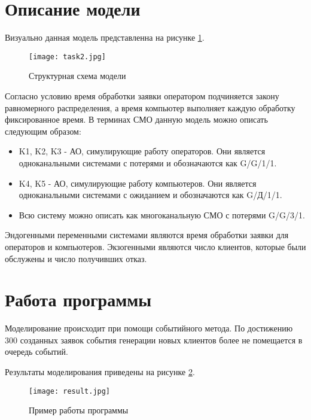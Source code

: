 \section{Описание модели}
	Визуально данная модель представленна на рисунке \ref{pic:scheme}.
	
	\begin{figure}[h]
		\begin{center}
			{\texttt{[image: task2.jpg]}
				\caption{Структурная схема модели}
				\label{pic:scheme}}
		\end{center}
	\end{figure}

	Согласно условию время обработки заявки оператором подчиняется закону равномерного распределения, а время компьютер выполняет каждую обработку фиксированное время. В терминах СМО данную модель можно описать следующим образом:
	\begin{itemize}
		\item K1, K2, K3 - АО, симулирующие работу операторов. Они является одноканальными системами с потерями и обозначаются как G/G/1/1.
		\item K4, K5 - АО, симулирующие работу компьютеров. Они является одноканальными системами с ожиданием и обозначаются как G/Д/1/1.
		\item Всю систему можно описать как многоканальную СМО с потерями G/G/3/1.
	\end{itemize}

	Эндогенными переменными системами являются время обработки заявки для операторов и компьютеров. Экзогенными являются число клиентов, которые были обслужены и число получивших отказ.

	
\section{Работа программы}
	Моделирование происходит при помощи событийного метода. По достижению 300 созданных заявок события генерации новых клиентов более не помещается в очередь событий.
	
	Результаты моделирования приведены на рисунке \ref{pic:res}.
	
	\begin{figure}[h]
		\begin{center}
			{\texttt{[image: result.jpg]}
				\caption{Пример работы программы}
				\label{pic:res}}
		\end{center}
	\end{figure}
	